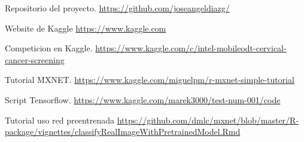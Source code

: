 % 

\begin{thebibliography}{99}

	\emph{} Repositorio del proyecto. \url{https://github.com/joseangeldiazg/}

	\emph{} Website de Kaggle \url{https://www.kaggle.com}	

	\emph{} Competicion en Kaggle. \url{https://www.kaggle.com/c/intel-mobileodt-cervical-cancer-screening}
	
	\emph{} Tutorial MXNET. \url{https://www.kaggle.com/miguelpm/r-mxnet-simple-tutorial}
	
	\emph{} Script Tensorflow. \url{https://www.kaggle.com/marek3000/test-num-001/code}
	
	\emph{} Tutorial uso red preentrenada \url{https://github.com/dmlc/mxnet/blob/master/R-package/vignettes/classifyRealImageWithPretrainedModel.Rmd}

\end{thebibliography}
